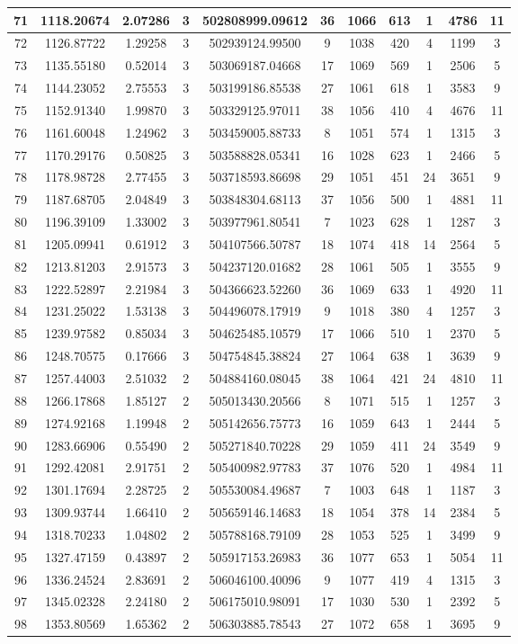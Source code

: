 \begin{longtable}{|c|c|c|c|c|c|c|c|c|c|c|}
\hline 
71&1118.20674&2.07286&3&502808999.09612&36&1066&613&1&4786&11\\ 
\hline 
72&1126.87722&1.29258&3&502939124.99500&9&1038&420&4&1199&3\\ 
\hline 
73&1135.55180&0.52014&3&503069187.04668&17&1069&569&1&2506&5\\ 
\hline 
74&1144.23052&2.75553&3&503199186.85538&27&1061&618&1&3583&9\\ 
\hline 
75&1152.91340&1.99870&3&503329125.97011&38&1056&410&4&4676&11\\ 
\hline 
76&1161.60048&1.24962&3&503459005.88733&8&1051&574&1&1315&3\\ 
\hline 
77&1170.29176&0.50825&3&503588828.05341&16&1028&623&1&2466&5\\ 
\hline 
78&1178.98728&2.77455&3&503718593.86698&29&1051&451&24&3651&9\\ 
\hline 
79&1187.68705&2.04849&3&503848304.68113&37&1056&500&1&4881&11\\ 
\hline 
80&1196.39109&1.33002&3&503977961.80541&7&1023&628&1&1287&3\\ 
\hline 
81&1205.09941&0.61912&3&504107566.50787&18&1074&418&14&2564&5\\ 
\hline 
82&1213.81203&2.91573&3&504237120.01682&28&1061&505&1&3555&9\\ 
\hline 
83&1222.52897&2.21984&3&504366623.52260&36&1069&633&1&4920&11\\ 
\hline 
84&1231.25022&1.53138&3&504496078.17919&9&1018&380&4&1257&3\\ 
\hline 
85&1239.97582&0.85034&3&504625485.10579&17&1066&510&1&2370&5\\ 
\hline 
86&1248.70575&0.17666&3&504754845.38824&27&1064&638&1&3639&9\\ 
\hline 
87&1257.44003&2.51032&2&504884160.08045&38&1064&421&24&4810&11\\ 
\hline 
88&1266.17868&1.85127&2&505013430.20566&8&1071&515&1&1257&3\\ 
\hline 
89&1274.92168&1.19948&2&505142656.75773&16&1059&643&1&2444&5\\ 
\hline 
90&1283.66906&0.55490&2&505271840.70228&29&1059&411&24&3549&9\\ 
\hline 
91&1292.42081&2.91751&2&505400982.97783&37&1076&520&1&4984&11\\ 
\hline 
92&1301.17694&2.28725&2&505530084.49687&7&1003&648&1&1187&3\\ 
\hline 
93&1309.93744&1.66410&2&505659146.14683&18&1054&378&14&2384&5\\ 
\hline 
94&1318.70233&1.04802&2&505788168.79109&28&1053&525&1&3499&9\\ 
\hline 
95&1327.47159&0.43897&2&505917153.26983&36&1077&653&1&5054&11\\ 
\hline 
96&1336.24524&2.83691&2&506046100.40096&9&1077&419&4&1315&3\\ 
\hline 
97&1345.02328&2.24180&2&506175010.98091&17&1030&530&1&2392&5\\ 
\hline 
98&1353.80569&1.65362&2&506303885.78543&27&1072&658&1&3695&9\\ 
\hline 
\end{longtable}
